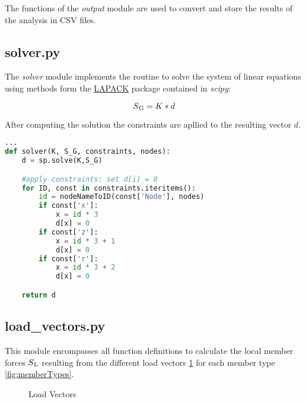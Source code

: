 The functions of the \textit{output} module are used to convert and store the results of the analysis in CSV files.

\subsection{solver.py}
\label{subsec:solver.py}

The \textit{solver} module implements the routine to solve the system of linear equations using methods form the \href{http://www.netlib.org/lapack/}{LAPACK} package contained in \textit{scipy}:

\begin{equation}
S\textsubscript{G} = K * d
\end{equation}

After computing the solution the constraints are apllied to the resulting vector $d$.

\begin{inconsolata}
\begin{lstlisting}[language=python]
...
def solver(K, S_G, constraints, nodes):
    d = sp.solve(K,S_G)

    #apply constraints: set d[i] = 0
    for ID, const in constraints.iteritems():
        id = nodeNameToID(const['Node'], nodes)
        if const['x']:
            x = id * 3
            d[x] = 0
        if const['z']:
            x = id * 3 + 1
            d[x] = 0
        if const['r']:
            x = id * 3 + 2
            d[x] = 0

    return d
\end{lstlisting}
\end{inconsolata}

\subsection{load\_vectors.py}
\label{subsec:loadvectors.py}

This module encompasses all function definitions to calculate the local member forces $S\textsubscript{L}$  resulting from the different load vectors \ref{fig:loadVec} for each member type \ref{fig:memberTypes}.


\begin{figure}[h]%
    \centering
    \qquad

    \centering
    
    \caption{Load Vectors}%
    \label{fig:loadVec}%
\end{figure}


